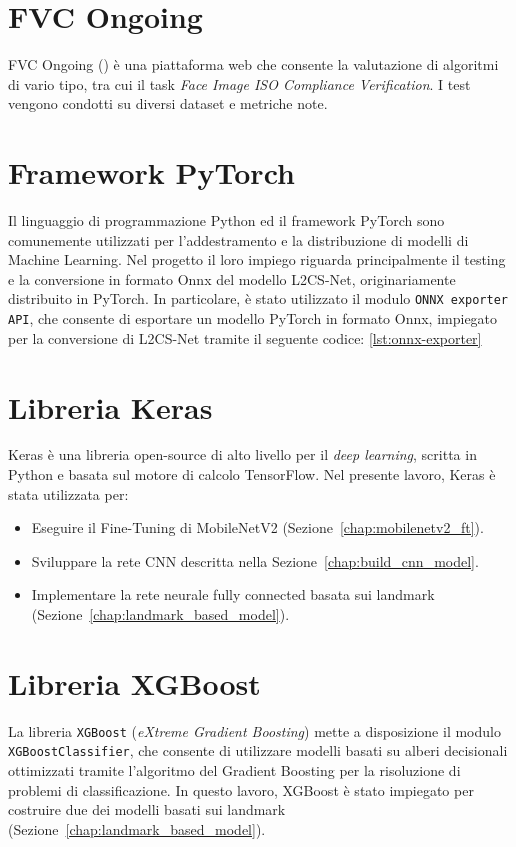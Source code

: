 \documentclass[12pt,a4paper,openright,twoside]{book}
\begin{document}
\section{FVC Ongoing}
FVC Ongoing (\cite{fvcongoing}) è una piattaforma web che consente la valutazione di algoritmi di vario tipo, tra cui il task \textit{Face Image ISO Compliance Verification}.
I test vengono condotti su diversi dataset e metriche note.

\section{Framework PyTorch}
Il linguaggio di programmazione Python ed il framework PyTorch sono comunemente utilizzati per l'addestramento e la distribuzione di modelli di Machine Learning. 
Nel progetto il loro impiego riguarda principalmente il testing e la conversione in formato Onnx del modello L2CS-Net, originariamente distribuito in PyTorch.
In particolare, è stato utilizzato il modulo \texttt{ONNX exporter API}, che consente di esportare un modello PyTorch in formato Onnx, impiegato per la conversione di L2CS-Net tramite il seguente codice: \cref{lst:onnx-exporter}


\section{Libreria Keras}
Keras è una libreria open-source di alto livello per il \textit{deep learning}, scritta in Python e basata sul motore di calcolo TensorFlow.  
Nel presente lavoro, Keras è stata utilizzata per:
\begin{itemize}
    \item Eseguire il Fine-Tuning di MobileNetV2 (Sezione~\ref{chap:mobilenetv2_ft}).
    \item Sviluppare la rete CNN descritta nella Sezione~\ref{chap:build_cnn_model}.
    \item Implementare la rete neurale fully connected basata sui landmark (Sezione~\ref{chap:landmark_based_model}).
\end{itemize}

\section{Libreria XGBoost}
La libreria \texttt{XGBoost} (\textit{eXtreme Gradient Boosting}) \cite{xgboost} mette a disposizione il modulo \texttt{XGBoostClassifier}, che consente di utilizzare modelli basati su alberi decisionali ottimizzati tramite l'algoritmo del Gradient Boosting per la risoluzione di problemi di classificazione.  
In questo lavoro, XGBoost è stato impiegato per costruire due dei modelli basati sui landmark (Sezione~\ref{chap:landmark_based_model}).
\end{document}
